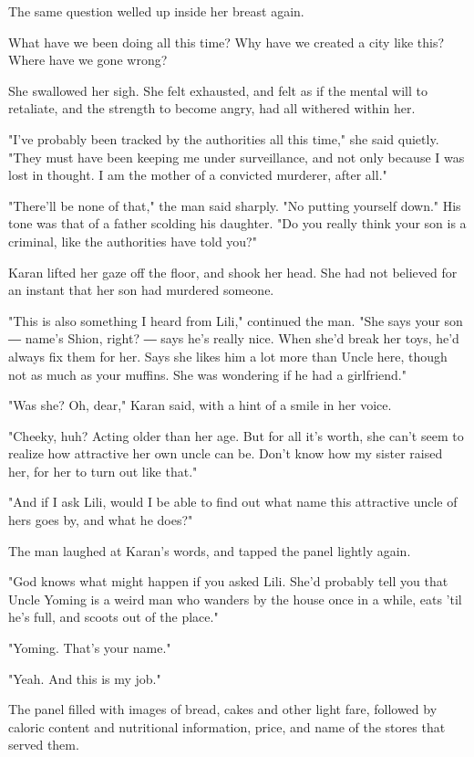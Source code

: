 The same question welled up inside her breast again.

What have we been doing all this time? Why have we created a city like
this? Where have we gone wrong?

She swallowed her sigh. She felt exhausted, and felt as if the mental
will to retaliate, and the strength to become angry, had all withered
within her.

"I've probably been tracked by the authorities all this time," she said
quietly. "They must have been keeping me under surveillance, and not
only because I was lost in thought. I am the mother of a convicted
murderer, after all."

"There'll be none of that," the man said sharply. "No putting yourself
down." His tone was that of a father scolding his daughter. "Do you
really think your son is a criminal, like the authorities have told
you?"

Karan lifted her gaze off the floor, and shook her head. She had not
believed for an instant that her son had murdered someone.

"This is also something I heard from Lili," continued the man. "She says
your son ― name's Shion, right? ― says he's really nice. When she'd
break her toys, he'd always fix them for her. Says she likes him a lot
more than Uncle here, though not as much as your muffins. She was
wondering if he had a girlfriend."

"Was she? Oh, dear," Karan said, with a hint of a smile in her voice.

"Cheeky, huh? Acting older than her age. But for all it's worth, she
can't seem to realize how attractive her own uncle can be. Don't know
how my sister raised her, for her to turn out like that."

"And if I ask Lili, would I be able to find out what name this
attractive uncle of hers goes by, and what he does?"

The man laughed at Karan's words, and tapped the panel lightly again.

"God knows what might happen if you asked Lili. She'd probably tell you
that Uncle Yoming is a weird man who wanders by the house once in a
while, eats 'til he's full, and scoots out of the place."

"Yoming. That's your name."

"Yeah. And this is my job."

The panel filled with images of bread, cakes and other light fare,
followed by caloric content and nutritional information, price, and name
of the stores that served them.

